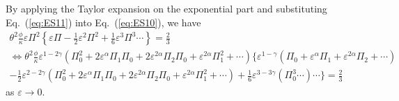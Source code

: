 \documentclass[aps,prl,superscriptaddress]{revtex4}  %
\begin{document}
By applying the Taylor expansion on the exponential part and substituting Eq.~(\ref{eq:ES11}) into Eq.~(\ref{eq:ES10}), we have
%
\begin{eqnarray}
\theta^2 \frac{\phi }{\kappa} \varepsilon \Pi^2 \left\{ \varepsilon \Pi  - \frac{1}{2}\varepsilon^2 \Pi^2 + \frac{1}{6}\varepsilon^3 \Pi^3 \cdots \right\} =  \frac{2}{3}  \nonumber   \\ 
\Leftrightarrow \theta^2 \frac{\phi }{\kappa} \varepsilon^{1-2 \gamma} \left( \Pi_0^2  + 2 \varepsilon^{\alpha} \Pi_1 \Pi_0 +  2 \varepsilon^{2 \alpha} \Pi_2 \Pi_0 +  \varepsilon^{2 \alpha} \Pi_1^2 + \cdots  \right) \{ \varepsilon^{1-\gamma} \left(\Pi_0 + \varepsilon^{\alpha} \Pi_1 + \varepsilon^{2\alpha} \Pi_2 + \cdots \right) \nonumber  \\  
- \frac{1}{2}\varepsilon^{2-2 \gamma} \left(\Pi_0^2  + 2 \varepsilon^{\alpha} \Pi_1 \Pi_0 +  2 \varepsilon^{2 \alpha} \Pi_2 \Pi_0 +  \varepsilon^{2 \alpha} \Pi_1^2 + \cdots \right) + \frac{1}{6}\varepsilon^{3-3 \gamma} \left(\Pi_0^3 \cdots \right)\cdots \} = \frac{2}{3} 
\label{eq:ES12}
\end{eqnarray}
%
as $\varepsilon \rightarrow 0$.
\end{document}
